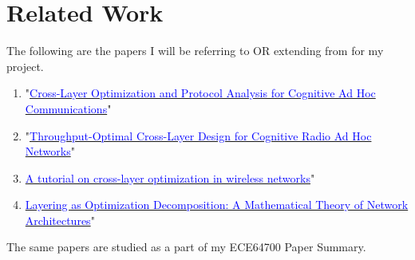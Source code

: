 \documentclass[12pt, draftcls, onecolumn]{IEEEtran}
\begin{document}
\section{Related Work}\label{IV}
The following are the papers I will be referring to OR extending from for my project. 
\begin{enumerate}
    \item "\href{http://ieeexplore.ieee.org/stamp/stamp.jsp?tp=&arnumber=7859326&isnumber=7859429}{\textcolor{blue}{Cross-Layer Optimization and Protocol Analysis for Cognitive Ad Hoc Communications}}"
    \item "\href{http://ieeexplore.ieee.org/stamp/stamp.jsp?tp=&arnumber=6881740&isnumber=7180482}{\textcolor{blue}{Throughput-Optimal Cross-Layer Design for Cognitive Radio Ad Hoc Networks}}"
    \item \href{http://ieeexplore.ieee.org/stamp/stamp.jsp?tp=&arnumber=1665000&isnumber=34851}{\textcolor{blue}{A tutorial on cross-layer optimization in wireless networks}}"
    \item \href{http://ieeexplore.ieee.org/stamp/stamp.jsp?tp=&arnumber=4118456&isnumber=4118453}{\textcolor{blue}{Layering as Optimization Decomposition: A Mathematical Theory of Network Architectures}}"
\end{enumerate}
The same papers are studied as a part of my ECE64700 Paper Summary.
\end{document}
